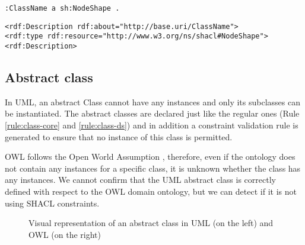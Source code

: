 \vspace{-\parskip}
\begin{minipage}[b]{.335\textwidth}
\begin{lstlisting}[language=Turtle, caption={Node shape declaration in Turtle syntax}, captionpos=b]
:ClassName a sh:NodeShape .
\end{lstlisting}
\end{minipage}%
\quad
\begin{minipage}[b]{.6\textwidth}
\begin{lstlisting}[language=RDF/XML, caption={Node shape declaration in RDF/XML syntax}, captionpos=b]
<rdf:Description rdf:about="http://base.uri/ClassName">
<rdf:type rdf:resource="http://www.w3.org/ns/shacl#NodeShape">
<rdf:Description>
\end{lstlisting}
\end{minipage}

\subsection{Abstract class}
\label{sec:class-abstract}

In UML, an abstract Class \citep{uml2.5} cannot have any instances and only its subclasses
can be instantiated.
The abstract classes are declared just like the regular ones (Rule \ref{rule:class-core} and \ref{rule:class-ds}) and in addition a constraint validation rule is generated to ensure that no instance of this class is permitted. 

OWL follows the Open World Assumption \citep{owl2}, therefore, even if the ontology does not contain any instances for a specific class, it is unknown whether the class has any instances. We cannot confirm that the UML abstract class is correctly defined with respect to the OWL domain ontology, but we can detect if it is not using SHACL constraints.

\begin{figure}[!ht]
	\centering
	\begin{subfigure}{.5\textwidth}
		\centering
	\end{subfigure}%
	\begin{subfigure}{.5\textwidth}
		\centering
	\end{subfigure}
	\caption{Visual representation of an abstract class in UML (on the left) and OWL (on the right)}
	\label{fig:class-abstract-visual}
\end{figure}

